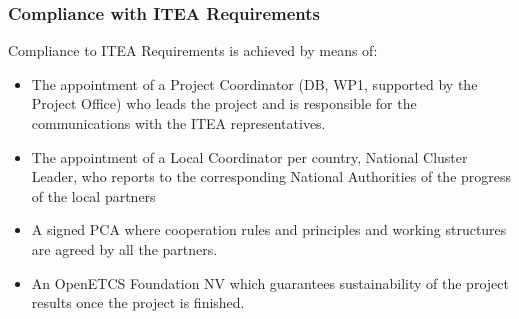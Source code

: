 \documentclass{template/openetcs_article}
\begin{document}
\subsubsection{Compliance with ITEA Requirements}
Compliance to ITEA Requirements is achieved by means of:
\begin{itemize}
\item The appointment of a Project Coordinator (DB, WP1, supported by the Project Office) who leads the project and is responsible for the communications with the ITEA representatives. 
\item The appointment of a Local Coordinator per country, National Cluster Leader, who reports to the corresponding National Authorities of the progress of the local partners
\item A signed PCA where cooperation rules and principles and working structures are agreed by all the partners.
\item An OpenETCS Foundation NV which guarantees sustainability of the project results once the project is finished.
\end{itemize}
\end{document}
